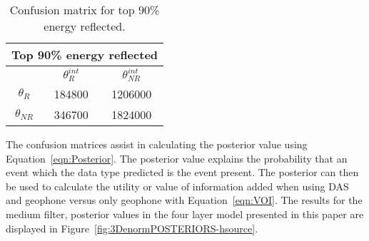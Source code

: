 \begin{table}[]
\centering
\caption{Confusion matrix for top 90\% energy reflected.}
\label{table:3dCONF}
\setlength{\tabcolsep}{1em}
\begin{tabular}{|c|c|c|}
 \multicolumn{3}{c}{Top 90\% energy reflected} \\
  \hline
 & $\theta_R^{int}$ & $\theta_{NR}^{int}$ \\
            \hline
 $\theta_R$ & 184800 & 1206000  \\
\hline
$\theta_{NR}$ & 346700 & 1824000 \\
\hline
\end{tabular}
\end{table}

The confusion matrices assist in calculating the posterior value using Equation~\ref{eqn:Posterior}. The posterior value explains the probability that an event which the data type predicted is the event present. The posterior can then be used to calculate the utility or value of information added when using DAS and geophone versus only geophone with Equation~\ref{eqn:VOI}. The results for the medium filter, posterior values in the four layer model presented in this paper are displayed in Figure~\ref{fig:3DenormPOSTERIORS-hsource}.




